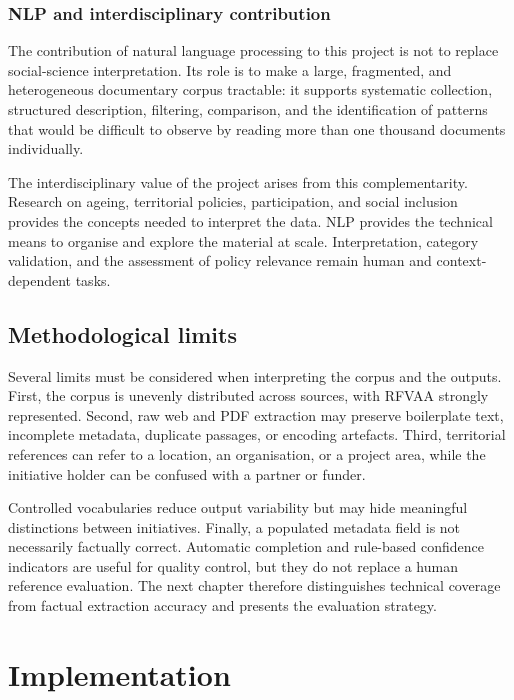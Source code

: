 \documentclass[
11pt,
english,
singlespacing,
headsepline,
]{MastersDoctoralThesis}
\begin{document}
\subsection{NLP and interdisciplinary contribution}

The contribution of natural language processing to this project is not to
replace social-science interpretation. Its role is to make a large, fragmented,
and heterogeneous documentary corpus tractable: it supports systematic
collection, structured description, filtering, comparison, and the
identification of patterns that would be difficult to observe by reading more
than one thousand documents individually.

The interdisciplinary value of the project arises from this complementarity.
Research on ageing, territorial policies, participation, and social inclusion
provides the concepts needed to interpret the data. NLP provides the technical
means to organise and explore the material at scale. Interpretation, category
validation, and the assessment of policy relevance remain human and
context-dependent tasks.

\section{Methodological limits}

Several limits must be considered when interpreting the corpus and the outputs.
First, the corpus is unevenly distributed across sources, with RFVAA strongly
represented. Second, raw web and PDF extraction may preserve boilerplate text, incomplete
metadata, duplicate passages, or encoding artefacts. Third,
territorial references can refer to a location, an organisation, or a project
area, while the initiative holder can be confused with a partner or funder.

Controlled vocabularies reduce output variability but may hide
meaningful distinctions between initiatives. Finally, a populated metadata field
is not necessarily factually correct. Automatic completion and rule-based
confidence indicators are useful for quality control, but they do not replace a
human reference evaluation. The next chapter therefore distinguishes technical
coverage from factual extraction accuracy and presents the evaluation strategy.

\chapter{Implementation}
\end{document}
